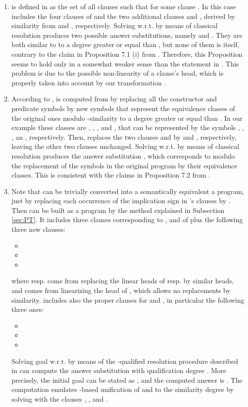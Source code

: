 \documentclass{sigplanconf}
\theoremstyle{definition}
\theoremstyle{plain}
\begin{document}
\begin{enumerate}

    \item  is defined in \cite{Ses02} as the set of all clauses  such that  for some clause . In this case  includes the four clauses of  and the two additional clauses  and , derived by similarity from  and , respectively. Solving  w.r.t.  by means of classical  resolution produces two possible answer substitutions, namely  and . They are both similar to  to a degree greater or equal than , but none of them is  itself, contrary to the claim in Proposition 7.1 (i) from \cite{Ses02}. Therefore, this Proposition seems to hold only in a somewhat weaker sense than the statement in \cite{Ses02}. This problem is due to the possible non-linearity of a clause's head, which is properly taken into account by our transformation .

    \item According to \cite{Ses02},  is computed from  by replacing all the constructor and predicate symbols by new symbols that represent the equivalence classes of the original ones modulo -similarity to a degree greater or equal than . In our example these classes are , , ,  and , that can be represented by the symbols , , ,  an , respectively. Then,  replaces the two clauses  and  by  and , respectively, leaving the other two clauses unchanged. Solving  w.r.t.  by means of classical  resolution produces the answer substitution , which corresponds to  modulo the replacement of the symbols in the original program by their equivalence classes. This is consistent with the claims in Proposition 7.2 from \cite{Ses02}.

    \item Note that  can be trivially converted into a semantically equivalent a  program, just by replacing each occurrence of the implication sign  in 's clauses by . Then  can be built as a  program by the method explained in Subsection \ref{sec:PT}. It includes three clauses corresponding to ,  and  of  plus the following three new clauses:
        \begin{itemize}
            \item 
            \item 
            \item 
        \end{itemize}
        where  resp.  come from replacing the linear heads of  resp.  by similar heads, and  comes from linearizing the head of , which allows no replacements by similarity.  includes also the proper clauses for  and , in particular the following three ones:
    \begin{itemize}
        \item 
        \item 
        \item 
    \end{itemize}
    Solving goal  w.r.t.  by means of the -qualified  resolution procedure described in \cite{RR08} can compute the answer substitution  with qualification degree . More precisely, the initial goal can be stated as , and the computed answer is . The computation emulates -based unification of  and  to the similarity degree  by solving  with the clauses , ,  and .


\end{enumerate}
\end{document}
